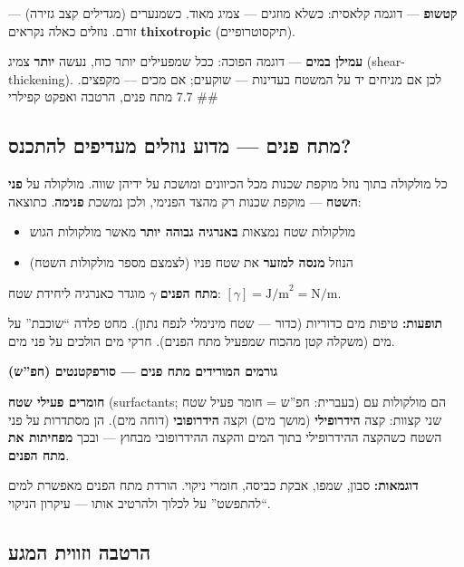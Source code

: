 \documentclass[
  hebrew,
  letterpaper,
  DIV=11,
  numbers=noendperiod]{scrreprt}
\providecommand{\tightlist}{%
  \setlength{\itemsep}{0pt}\setlength{\parskip}{0pt}}
\begin{document}
\textbf{קטשופ} --- דוגמה קלאסית: כשלא מוזגים --- צמיג מאוד. כשמנערים
(מגדילים קצב גזירה) --- זורם. נוזלים כאלה נקראים \textbf{thixotropic}
(תיקסוטרופיים).

\textbf{עמילן במים} --- דוגמה הפוכה: ככל שמפעילים יותר כוח, נעשה
\textbf{יותר} צמיג (shear-thickening). לכן אם מניחים יד על המשטח בעדינות
--- שוקעים; אם מכים --- מקפצים. \#\# 7.7 מתח פנים, הרטבה ואפקט קפילרי

\subsection{מתח פנים --- מדוע נוזלים מעדיפים
להתכנס?}\label{ux5deux5eaux5d7-ux5e4ux5e0ux5d9ux5dd-ux5deux5d3ux5d5ux5e2-ux5e0ux5d5ux5d6ux5dcux5d9ux5dd-ux5deux5e2ux5d3ux5d9ux5e4ux5d9ux5dd-ux5dcux5d4ux5eaux5dbux5e0ux5e1}

כל מולקולה בתוך נוזל מוקפת שכנות מכל הכיוונים ומושכת על ידיהן שווה.
מולקולה על \textbf{פני השטח} --- מוקפת שכנות רק מהצד הפנימי, ולכן נמשכת
\textbf{פנימה}. כתוצאה:

\begin{itemize}
\tightlist
\item
  מולקולות שטח נמצאות \textbf{באנרגיה גבוהה יותר} מאשר מולקולות הגוש
\item
  הנוזל \textbf{מנסה למזער} את שטח פניו (לצמצם מספר מולקולות השטח)
\end{itemize}

\textbf{מתח הפנים} \(\gamma\) מוגדר כאנרגיה ליחידת שטח:
\([\gamma] = \text{J/m}^2 = \text{N/m}\).

\textbf{תופעות:} טיפות מים כדוריות (כדור --- שטח מינימלי לנפח נתון). מחט
פלדה ``שוכבת'' על מים (משקלה קטן מהכוח שמפעיל מתח הפנים). חרקי מים
הולכים על פני מים.

\textbf{גורמים המורידים מתח פנים --- סורפקטנטים (חפ''ש)}

\textbf{חומרים פעילי שטח} (surfactants; בעברית: חפ''ש = חומר פעיל שטח)
הם מולקולות עם שני קצוות: קצה \textbf{הידרופילי} (מושך מים) וקצה
\textbf{הידרופובי} (דוחה מים). הן מסתדרות על פני השטח כשהקצה ההידרופילי
בתוך המים והקצה ההידרופובי מבחוץ --- ובכך \textbf{מפחיתות את מתח הפנים}.

\textbf{דוגמאות:} סבון, שמפו, אבקת כביסה, חומרי ניקוי. הורדת מתח הפנים
מאפשרת למים ``להתפשט'' על לכלוך ולהרטיב אותו --- עיקרון הניקוי.

\subsection{הרטבה וזווית
המגע}\label{ux5d4ux5e8ux5d8ux5d1ux5d4-ux5d5ux5d6ux5d5ux5d5ux5d9ux5ea-ux5d4ux5deux5d2ux5e2}
\end{document}
